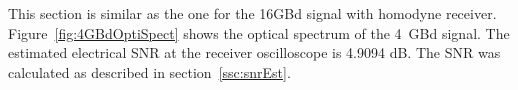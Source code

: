 \begin{refsection}
%
%

%
This section is similar as the one for the 16GBd signal with homodyne receiver.
Figure~\ref{fig:4GBdOptiSpect} shows the optical spectrum of the 4~GBd signal. The estimated electrical SNR at the receiver oscilloscope is 4.9094 dB. The SNR was calculated as described in section~\ref{ssc:snrEst}.


\end{refsection}
